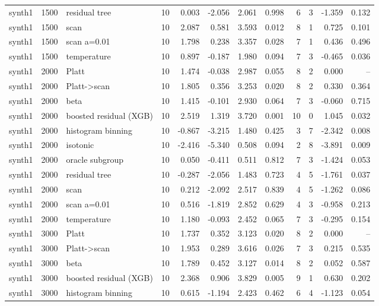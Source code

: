 \begin{tabular}{lllrrrrrrrrr}
synth1 & 1500 & residual tree & 10 & 0.003 & -2.056 & 2.061 & 0.998 & 6 & 3 & -1.359 & 0.132 \\
synth1 & 1500 & scan & 10 & 2.087 & 0.581 & 3.593 & 0.012 & 8 & 1 & 0.725 & 0.101 \\
synth1 & 1500 & scan a=0.01 & 10 & 1.798 & 0.238 & 3.357 & 0.028 & 7 & 1 & 0.436 & 0.496 \\
synth1 & 1500 & temperature & 10 & 0.897 & -0.187 & 1.980 & 0.094 & 7 & 3 & -0.465 & 0.036 \\
synth1 & 2000 & Platt & 10 & 1.474 & -0.038 & 2.987 & 0.055 & 8 & 2 & 0.000 & -- \\
synth1 & 2000 & Platt->scan & 10 & 1.805 & 0.356 & 3.253 & 0.020 & 8 & 2 & 0.330 & 0.364 \\
synth1 & 2000 & beta & 10 & 1.415 & -0.101 & 2.930 & 0.064 & 7 & 3 & -0.060 & 0.715 \\
synth1 & 2000 & boosted residual (XGB) & 10 & 2.519 & 1.319 & 3.720 & 0.001 & 10 & 0 & 1.045 & 0.032 \\
synth1 & 2000 & histogram binning & 10 & -0.867 & -3.215 & 1.480 & 0.425 & 3 & 7 & -2.342 & 0.008 \\
synth1 & 2000 & isotonic & 10 & -2.416 & -5.340 & 0.508 & 0.094 & 2 & 8 & -3.891 & 0.009 \\
synth1 & 2000 & oracle subgroup & 10 & 0.050 & -0.411 & 0.511 & 0.812 & 7 & 3 & -1.424 & 0.053 \\
synth1 & 2000 & residual tree & 10 & -0.287 & -2.056 & 1.483 & 0.723 & 4 & 5 & -1.761 & 0.037 \\
synth1 & 2000 & scan & 10 & 0.212 & -2.092 & 2.517 & 0.839 & 4 & 5 & -1.262 & 0.086 \\
synth1 & 2000 & scan a=0.01 & 10 & 0.516 & -1.819 & 2.852 & 0.629 & 4 & 3 & -0.958 & 0.213 \\
synth1 & 2000 & temperature & 10 & 1.180 & -0.093 & 2.452 & 0.065 & 7 & 3 & -0.295 & 0.154 \\
synth1 & 3000 & Platt & 10 & 1.737 & 0.352 & 3.123 & 0.020 & 8 & 2 & 0.000 & -- \\
synth1 & 3000 & Platt->scan & 10 & 1.953 & 0.289 & 3.616 & 0.026 & 7 & 3 & 0.215 & 0.535 \\
synth1 & 3000 & beta & 10 & 1.789 & 0.452 & 3.127 & 0.014 & 8 & 2 & 0.052 & 0.587 \\
synth1 & 3000 & boosted residual (XGB) & 10 & 2.368 & 0.906 & 3.829 & 0.005 & 9 & 1 & 0.630 & 0.202 \\
synth1 & 3000 & histogram binning & 10 & 0.615 & -1.194 & 2.423 & 0.462 & 6 & 4 & -1.123 & 0.054 \\

\end{tabular}
